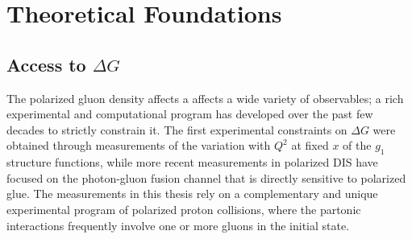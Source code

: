 \chapter{Theoretical Foundations}





\section{Access to $\Delta G$}

The polarized gluon density affects a affects a wide variety of observables; a
rich experimental and computational program has developed over the past few
decades to strictly constrain it. The first experimental constraints on \(\Delta
G\) were obtained through measurements of the variation with \(Q^2\) at fixed
\(x\) of the \(g_1\) structure functions, while more recent measurements in
polarized DIS have focused on the photon-gluon fusion channel that is directly
sensitive to polarized glue. The measurements in this thesis rely on a
complementary and unique experimental program of polarized proton collisions,
where the partonic interactions frequently involve one or more gluons in the
initial state.




